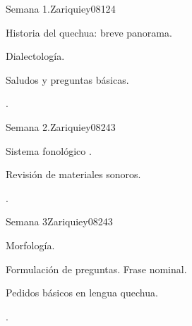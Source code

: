 \begin{syllabus}
\begin{competences}
    \item {}
    \item {}
    \item {}
    \item {}
\end{competences}

\begin{unit}{Semana 1.}{}{Zariquiey08}{12}{4}
   \begin{topics}
      \item Historia del quechua: breve panorama.
      \item Dialectología.
      \item Saludos y preguntas básicas.
   \end{topics}

   \begin{learningoutcomes}
      \item .
   \end{learningoutcomes}
\end{unit}

\begin{unit}{Semana 2.}{}{Zariquiey08}{24}{3}
   \begin{topics}
      \item Sistema fonológico .
      \item Revisión de materiales sonoros.
   \end{topics}

   \begin{learningoutcomes}
      \item . 
      \end{learningoutcomes}
\end{unit}

\begin{unit}{Semana 3}{}{Zariquiey08}{24}{3}
   \begin{topics}
      \item Morfología.
      \item Formulación de preguntas. Frase nominal.
      \item Pedidos básicos en lengua quechua.
   \end{topics}

   \begin{learningoutcomes}
      \item .
     
   \end{learningoutcomes}
\end{unit}


\end{syllabus}
